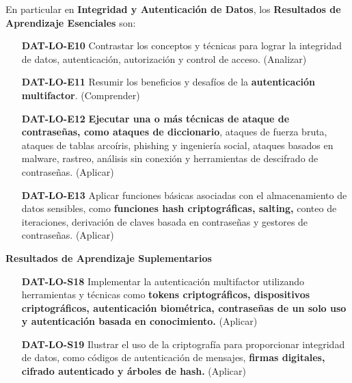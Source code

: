 \newpage En particular en \textbf{Integridad y Autenticación de Datos}, los \textbf{Resultados de Aprendizaje Esenciales} son: 
\begin{itemize}
  \item[\textbf{DAT-LO-E10}] Contrastar los conceptos y técnicas para lograr la integridad de datos, autenticación, autorización y control de acceso. (Analizar)
  \item[\textbf{DAT-LO-E11}] Resumir los beneficios y desafíos de la \textbf{autenticación multifactor}. (Comprender)
  \item[\textbf{DAT-LO-E12}] \textbf{Ejecutar una o más técnicas de ataque de contraseñas, como ataques de diccionario}, ataques de fuerza bruta, ataques de tablas arcoíris, phishing y ingeniería social, ataques basados en malware, rastreo, análisis sin conexión y herramientas de descifrado de contraseñas. (Aplicar)
  \item[\textbf{DAT-LO-E13}] Aplicar funciones básicas asociadas con el almacenamiento de datos sensibles, como \textbf{funciones hash criptográficas, salting, }conteo de iteraciones, derivación de claves basada en contraseñas y gestores de contraseñas. (Aplicar)
\end{itemize}

\textbf{Resultados de Aprendizaje Suplementarios}
\begin{itemize}
  \item[\textbf{DAT-LO-S18}] Implementar la autenticación multifactor utilizando herramientas y técnicas como \textbf{tokens criptográficos, dispositivos criptográficos, autenticación biométrica, contraseñas de un solo uso y autenticación basada en conocimiento.} (Aplicar)
  \item[\textbf{DAT-LO-S19}] Ilustrar el uso de la criptografía para proporcionar integridad de datos, como códigos de autenticación de mensajes,\textbf{ firmas digitales, cifrado autenticado y árboles de hash.} (Aplicar)
\end{itemize}

\newpage

